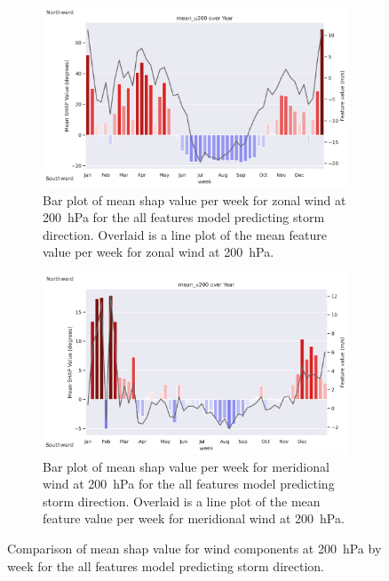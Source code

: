 \begin{figure}[ht]
    \centering
    \begin{subfigure}[t]{\textwidth}
        \centering
        \includegraphics[width=\textwidth]{../figures/generated/experiments/storm_direction/temporal_corr/storm_direction_all_shap_mean_u200_by_week_over_year.png}
        \caption{Bar plot of mean \acrshort{shap} value per week for zonal wind at \SI{200}{\hecto\pascal} for the all features model predicting storm direction. Overlaid is a line plot of the mean feature value per week for zonal wind at \SI{200}{\hecto\pascal}.}
        \label{fig:storm_direction_all_shap_mean_u200_by_week_over_year}
    \end{subfigure}
    \vspace{1em}
    \begin{subfigure}[t]{\textwidth}
        \centering
        \includegraphics[width=\textwidth]{../figures/generated/experiments/storm_direction/temporal_corr/storm_direction_all_shap_mean_v200_by_week_over_year.png}
        \caption{Bar plot of mean \acrshort{shap} value per week for meridional wind at \SI{200}{\hecto\pascal} for the all features model predicting storm direction. Overlaid is a line plot of the mean feature value per week for meridional wind at \SI{200}{\hecto\pascal}.}
        \label{fig:storm_direction_all_shap_mean_v200_by_week_over_year}
    \end{subfigure}
    \caption{Comparison of mean \acrshort{shap} value for wind components at \SI{200}{\hecto\pascal} by week for the all features model predicting storm direction.}
    \label{fig:storm_direction_wind_200_by_week_over_year}
\end{figure}

